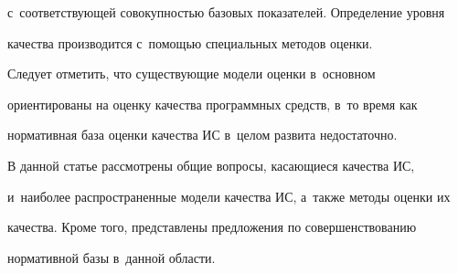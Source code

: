 с~со\-от\-вет\-ст\-ву\-ющей со\-во\-куп\-ностью базовых показателей. Определение уровня 

качества производится с~по\-мощью специальных методов оценки.

     

     Следует отметить, что существующие модели оценки в~основном 

ориентированы на оценку качества программных средств, в~то время как 

нормативная база оценки качества ИС в~целом развита недостаточно.

     

     В данной статье рассмотрены общие вопросы, ка\-са\-ющи\-еся качества ИС, 

и~наиболее распространенные модели качества ИС, а~так\-же методы оценки их 

качества. Кроме того, пред\-став\-ле\-ны предложения по совершенствованию 

нормативной базы в~данной об\-ласти.



\vspace*{-4pt}



